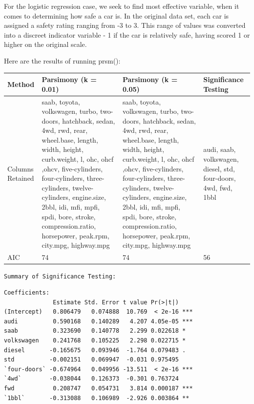 \documentclass[letter]{article}
\begin{document}
\newpage


For the logistic regression case, we seek to find most effective variable, when it comes to determining how safe a car is.  In the original data set, each car is assigned a safety rating ranging from -3 to 3.  This range of values was converted into a discreet indicator variable - 1 if the car is relatively safe, having scored 1 or higher on the original scale.


Here are the results of running prsm():\\
\begin{center}
    \begin{tabular}{ | l |  p{4cm} |  p{4cm} | p{4cm} |}
    \hline
    Method & Parsimony (k = 0.01) & Parsimony (k = 0.05) & Significance Testing \\ \hline
    	
    Columns Retained & saab, toyota, volkswagen, turbo, two-doors, hatchback, sedan, 4wd, rwd, rear, wheel.base, length, width, height, curb.weight, l, ohc, ohcf ,ohcv, five-cylinders, four-cylinders, three-cylinders, twelve-cylinders, engine.size, 2bbl, idi, mfi, mpfi, spdi, bore, stroke, compression.ratio, horsepower, peak.rpm, city.mpg, highway.mpg & saab, toyota, volkswagen, turbo, two-doors, hatchback, sedan, 4wd, rwd, rear, wheel.base, length, width, height, curb.weight, l, ohc, ohcf ,ohcv, five-cylinders, four-cylinders, three-cylinders, twelve-cylinders, engine.size, 2bbl, idi, mfi, mpfi, spdi, bore, stroke, compression.ratio, horsepower, peak.rpm, city.mpg, highway.mpg & audi, saab, volkswagen, diesel, std, four-doors, 4wd, fwd, 1bbl\\ \hline
    
    AIC & 74 & 74 & 56\\ \hline
    
    \end{tabular}
\end{center}



\texttt{Summary of Significance Testing:}\\
\begin{verbatim}
Coefficients:
              Estimate Std. Error t value Pr(>|t|)    
(Intercept)   0.806479   0.074888  10.769  < 2e-16 ***
audi          0.590168   0.140289   4.207 4.05e-05 ***
saab          0.323690   0.140778   2.299 0.022618 *  
volkswagen    0.241768   0.105225   2.298 0.022715 *  
diesel       -0.165675   0.093946  -1.764 0.079483 .  
std          -0.002151   0.069947  -0.031 0.975495    
`four-doors` -0.674964   0.049956 -13.511  < 2e-16 ***
`4wd`        -0.038044   0.126373  -0.301 0.763724    
fwd           0.208747   0.054731   3.814 0.000187 ***
`1bbl`       -0.313088   0.106989  -2.926 0.003864 ** 

\end{verbatim}
 
\end{document}
